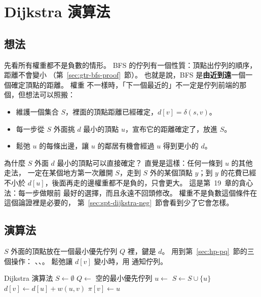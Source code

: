 \section{Dijkstra 演算法}
\label{sec:spt-dijkstra}

\subsection{想法}

先看所有權重都不是負數的情形。 BFS 的佇列有一個性質：頂點出佇列的順序，距離不會變小
（第~\ref{sec:gtr-bfs-proof}~節）。 也就是說，BFS 是\textbf{由近到遠}一個一個確定頂點的距離。 權重
不一樣時，「下一個最近的」不一定是佇列前端的那個，但想法可以照搬：

\begin{itemize}
\item 維護一個集合 $S$，裡面的頂點距離已經確定，$d[v] = \delta(s, v)$。
\item 每一步從 $S$ 外面挑 $d$ 最小的頂點 $u$，宣布它的距離確定了，放進 $S$。
\item 鬆弛 $u$ 的每條出邊，讓 $u$ 的鄰居有機會經過 $u$ 得到更小的 $d$。
\end{itemize}

為什麼 $S$ 外面 $d$ 最小的頂點可以直接確定？ 直覺是這樣：任何一條到 $u$ 的其他走法，
一定在某個地方第一次離開 $S$，走到 $S$ 外的某個頂點 $y$；到 $y$ 的花費已經不小於
$d[u]$，後面再走的邊權重都不是負的，只會更大。 這是第~19~章的貪心法：每一步做眼前
最好的選擇，而且永遠不回頭修改。 權重不是負數這個條件在這個論證裡是必要的，
第~\ref{sec:spt-dijkstra-neg}~節會看到少了它會怎樣。

\subsection{演算法}

$S$ 外面的頂點放在一個最小優先佇列 $Q$ 裡，鍵是 $d$。 用到第~\ref{sec:hp-pq}~節的三個操作：
、、。 鬆弛讓 $d[v]$ 變小時，用
 通知佇列。

\begin{pseudo}[label=alg:spt-dijkstra]{Dijkstra 演算法}
    \State {}
    \State $S \gets \emptyset$
    \State $Q \gets$ 空的最小優先佇列
        \State {}
    \EndFor
        \State $u \gets$  
        \State $S \gets S \cup \{u\}$
         
                \State $d[v] \gets d[u] + w(u, v)$
                \State $\pi[v] \gets u$
                \State {}
            \EndIf
        \EndFor
    \EndWhile
\EndProcedure
\end{pseudo}

